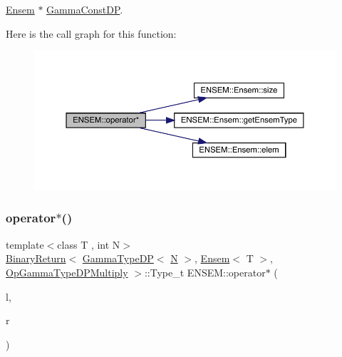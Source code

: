 \mbox{\hyperlink{classENSEM_1_1Ensem}{Ensem}} $\ast$ \mbox{\hyperlink{classENSEM_1_1GammaConstDP}{Gamma\+Const\+DP}}. 

Here is the call graph for this function\+:\nopagebreak
\begin{figure}[H]
\begin{center}
\leavevmode
\includegraphics[width=350pt]{d1/d9e/group__eensem_ga0377e46872c4fb569a240b0b60ef577e_cgraph}
\end{center}
\end{figure}
\mbox{\label{group__eensem_ga53d61b0a5109e4f59f7b77a3fb4817f9}} 
\subsubsection{\texorpdfstring{operator$\ast$()}{operator*()}\hspace{0.1cm}{\footnotesize\ttfamily [10/11]}}
{\footnotesize\ttfamily template$<$class T , int N$>$ \\
\mbox{\hyperlink{structENSEM_1_1BinaryReturn}{Binary\+Return}}$<$ \mbox{\hyperlink{classENSEM_1_1GammaTypeDP}{Gamma\+Type\+DP}}$<$ \mbox{\hyperlink{adat__devel_2lib_2hadron_2operator__name__util_8cc_a7722c8ecbb62d99aee7ce68b1752f337}{N}} $>$, \mbox{\hyperlink{classENSEM_1_1Ensem}{Ensem}}$<$ T $>$, \mbox{\hyperlink{structENSEM_1_1OpGammaTypeDPMultiply}{Op\+Gamma\+Type\+D\+P\+Multiply}} $>$\+::Type\+\_\+t E\+N\+S\+E\+M\+::operator$\ast$ (\begin{DoxyParamCaption}\item[{const \mbox{\hyperlink{classENSEM_1_1GammaTypeDP}{Gamma\+Type\+DP}}$<$ \mbox{\hyperlink{adat__devel_2lib_2hadron_2operator__name__util_8cc_a7722c8ecbb62d99aee7ce68b1752f337}{N}} $>$ \&}]{l,  }\item[{const \mbox{\hyperlink{classENSEM_1_1Ensem}{Ensem}}$<$ T $>$ \&}]{r }\end{DoxyParamCaption})\hspace{0.3cm}{\ttfamily [inline]}}



